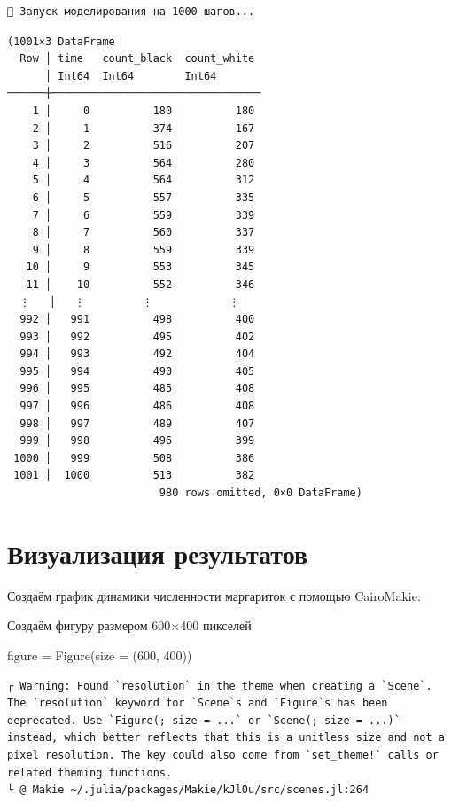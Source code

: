 \documentclass[
  12pt,
  a4paper,
  DIV=11,
  numbers=noendperiod]{scrreprt}
\newenvironment{Shaded}{\begin{snugshade}}{\end{snugshade}}
\newcommand{\FloatTok}[1]{\textcolor[rgb]{0.68,0.00,0.00}{#1}}
\newcommand{\FunctionTok}[1]{\textcolor[rgb]{0.28,0.35,0.67}{#1}}
\newcommand{\NormalTok}[1]{\textcolor[rgb]{0.00,0.23,0.31}{#1}}
\newcommand{\OperatorTok}[1]{\textcolor[rgb]{0.37,0.37,0.37}{#1}}
\begin{document}
\begin{verbatim}
🔄 Запуск моделирования на 1000 шагов...
\end{verbatim}

\begin{verbatim}
(1001×3 DataFrame
  Row │ time   count_black  count_white 
      │ Int64  Int64        Int64       
──────┼─────────────────────────────────
    1 │     0          180          180
    2 │     1          374          167
    3 │     2          516          207
    4 │     3          564          280
    5 │     4          564          312
    6 │     5          557          335
    7 │     6          559          339
    8 │     7          560          337
    9 │     8          559          339
   10 │     9          553          345
   11 │    10          552          346
  ⋮   │   ⋮         ⋮            ⋮
  992 │   991          498          400
  993 │   992          495          402
  994 │   993          492          404
  995 │   994          490          405
  996 │   995          485          408
  997 │   996          486          408
  998 │   997          489          407
  999 │   998          496          399
 1000 │   999          508          386
 1001 │  1000          513          382
                        980 rows omitted, 0×0 DataFrame)
\end{verbatim}

\section{Визуализация
результатов}\label{ux432ux438ux437ux443ux430ux43bux438ux437ux430ux446ux438ux44f-ux440ux435ux437ux443ux43bux44cux442ux430ux442ux43eux432}

Создаём график динамики численности маргариток с помощью CairoMakie:

Создаём фигуру размером 600×400 пикселей

\begin{Shaded}
\begin{Highlighting}[]
\NormalTok{figure }\OperatorTok{=} \FunctionTok{Figure}\NormalTok{(size }\OperatorTok{=}\NormalTok{ (}\FloatTok{600}\NormalTok{, }\FloatTok{400}\NormalTok{))}
\end{Highlighting}
\end{Shaded}

\begin{verbatim}
┌ Warning: Found `resolution` in the theme when creating a `Scene`. The `resolution` keyword for `Scene`s and `Figure`s has been deprecated. Use `Figure(; size = ...` or `Scene(; size = ...)` instead, which better reflects that this is a unitless size and not a pixel resolution. The key could also come from `set_theme!` calls or related theming functions.
└ @ Makie ~/.julia/packages/Makie/kJl0u/src/scenes.jl:264
\end{verbatim}
\end{document}
